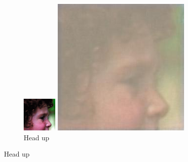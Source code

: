 \documentclass[11pt,twocolumn,twoside,paper=a4]{IEEEtran}
\begin{document}
\begin{figure}[ht]
\par\bigskip

\begin{subfigure}{0.45\textwidth}
  \centering
  \begin{minipage}[b]{0.45\textwidth}
    \includegraphics[width=\textwidth]{../images/head_low.jpg}
    \caption{Head low}
    \label{fig:head_low}
  \end{minipage}
  \hfill
  \begin{minipage}[b]{0.45\textwidth}
    \includegraphics[width=\textwidth]{../images/head_up.jpg}
    \caption{Head up}
    \label{fig:head_up}
  \end{minipage}
\end{subfigure}


\end{figure}
\end{document}
